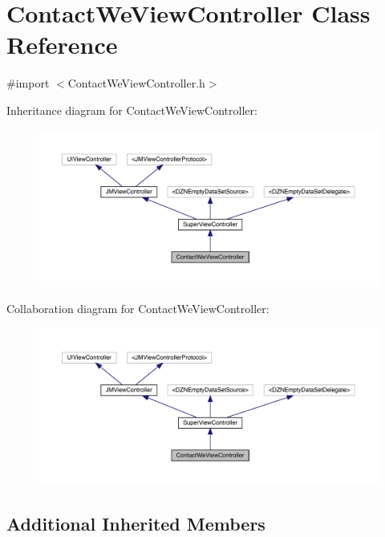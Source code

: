 \hypertarget{interface_contact_we_view_controller}{}\section{Contact\+We\+View\+Controller Class Reference}
\label{interface_contact_we_view_controller}


{\ttfamily \#import $<$Contact\+We\+View\+Controller.\+h$>$}



Inheritance diagram for Contact\+We\+View\+Controller\+:\nopagebreak
\begin{figure}[H]
\begin{center}
\leavevmode
\includegraphics[width=350pt]{interface_contact_we_view_controller__inherit__graph}
\end{center}
\end{figure}


Collaboration diagram for Contact\+We\+View\+Controller\+:\nopagebreak
\begin{figure}[H]
\begin{center}
\leavevmode
\includegraphics[width=350pt]{interface_contact_we_view_controller__coll__graph}
\end{center}
\end{figure}
\subsection*{Additional Inherited Members}


